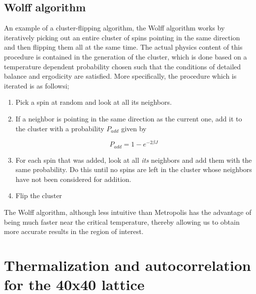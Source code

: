 \documentclass[11pt,a4paper]{article}
\begin{document}
\subsection{Wolff algorithm}
An example of a cluster-flipping algorithm, the Wolff algorithm works by iteratively picking out
 an entire cluster of spins pointing in the same direction and then flipping them all at the same time. The actual physics content of this 
 procedure is contained in the generation of the cluster, which is done based on a temperature dependent probability chosen such that the
 conditions of detailed balance and ergodicity are satisfied.
 More specifically, the procedure which is iterated is as followsi;
 \begin{enumerate}
 \item Pick a spin at random and look at all its neighbors.
 \item If a neighbor is pointing in the same direction as the current one, add it to the cluster with a probability $P_{add}$ given by

\begin{equation}\label{eq:A-ratio}
    P_{add} = 1 - e^{-2\beta J}
\end{equation}
 

 \item For each spin that was added, look at all \textit{its} neighbors and add them with the same probability. Do this until no spins are left
 in the cluster whose neighbors have not been considered for addition.
 \item Flip the cluster

 \end{enumerate}

The Wolff algorithm, although less intuitive than Metropolis has the advantage of being much faster near the critical temperature, thereby
 allowing us to obtain more accurate results in the region of interest.







\section{Thermalization and autocorrelation for the 40x40 lattice}
\end{document}
